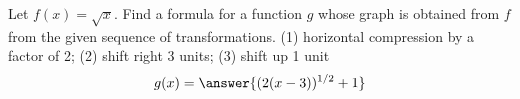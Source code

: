 \documentclass{ximera}
\begin{document}
\begin{exercise}
Let $f(x) = \sqrt{x}$. Find a formula for a function $g$ whose graph is obtained from $f$ from the given
sequence of transformations.
(1) horizontal compression by a factor of 2; (2) shift right 3 units; (3) shift up 1 unit
\[
g(x)=\answer{(2(x-3))^{1/2}+1}
\]
\end{exercise}
\end{document}
